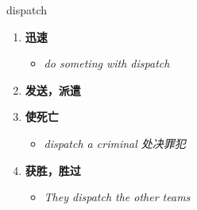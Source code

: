 
\begin{frame}
{\huge dispatch}
\begin{center}
\begin{enumerate}\Large
  \item \textbf{迅速}
  \begin{itemize}
    \item \em{\Large{do someting with dispatch}}
  \end{itemize}
  \item \textbf{发送，派遣}
  \item \textbf{使死亡}
  \begin{itemize}
    \item \em{\Large{dispatch a criminal 处决罪犯}}
  \end{itemize}
  \item \textbf{获胜，胜过}
  \begin{itemize}
    \item \em{\Large{They dispatch the other teams}}
  \end{itemize}
\end{enumerate}
\end{center}
\end{frame}
